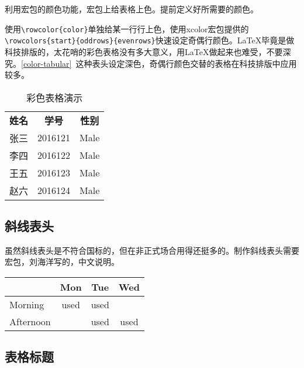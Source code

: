 利用宏包的颜色功能，宏包上给表格上色。提前定义好所需要的颜色。

\begin{latex}
\end{latex}

使用\lstinline|\rowcolor{color}|单独给某一行行上色，使用xcolor宏包提供的\lstinline|\rowcolors{start}{oddrows}{evenrows}|快速设定奇偶行颜色。\LaTeX{}毕竟是做科技排版的，太花哨的彩色表格没有多大意义，用\LaTeX{}做起来也难受，不要深究。\autoref{color-tabular}~这种表头设定深色，奇偶行颜色交替的表格在科技排版中应用较多。

\begin{table}[!htb]
    \centering
    \caption{彩色表格演示}
    \label{color-tabular}
    \begin{tabular}{ccc}
        \rowcolor{header}
        \color{white} \textbf{姓名} &\color{white} \textbf{学号} &\color{white} \textbf{性别}\\
        张三 & 2016121 & Male\\
        李四 & 2016122 & Male\\
        王五 & 2016123 & Male\\
        赵六 & 2016124 & Male\\
    \end{tabular}
\end{table}

\subsection{斜线表头}

虽然斜线表头是不符合国标的，但在非正式场合用得还挺多的。制作斜线表头需要宏包，刘海洋写的，中文说明。

\begin{codeshow}
\centering
\begin{tabular}{|l|ccc|}
    \hline
    \diagbox{Time}{Room}{Day}
        &Mon&Tue&Wed\\
    \hline
    Morning&used&used&\\
    Afternoon& &used&used\\
    \hline
\end{tabular}
\end{codeshow}

\subsection{表格标题}

